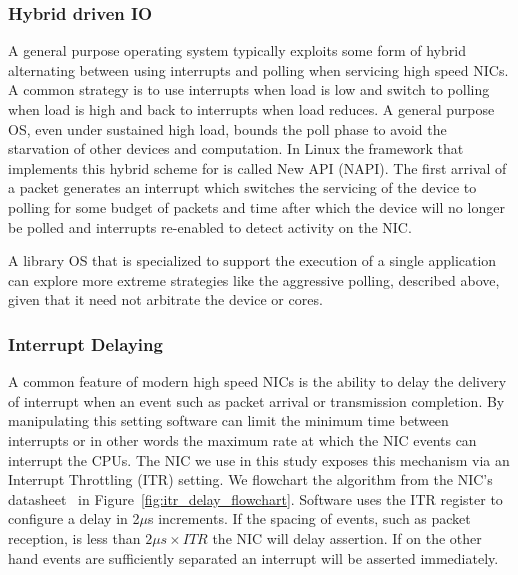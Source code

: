 \subsubsection{Hybrid driven IO}
A general purpose operating system typically exploits some form of hybrid alternating between using interrupts and polling when servicing high speed NICs. A common strategy is to use interrupts when load is low and switch to polling when load is high and back to interrupts when load reduces.  A general purpose OS, even under sustained high load, bounds the poll phase to avoid the starvation of other devices and computation.  In Linux the framework that implements this hybrid scheme for is called New API (NAPI)\cite{NAPI}.  The first arrival of a packet generates an interrupt which switches the servicing of the device to polling for some budget of packets and time after which the device will no longer be polled and interrupts re-enabled to detect activity on the NIC.  

A library OS that is specialized to support the execution of a single application can explore more extreme strategies like the aggressive polling, described above, given that it need not arbitrate the device or cores.

\subsubsection{Interrupt Delaying}

A common feature of modern high speed NICs is the ability to delay the delivery of interrupt when an event such as packet arrival or transmission completion. By manipulating this setting software can limit the minimum time between interrupts or in other words the maximum rate at which the NIC events can interrupt the CPUs. The NIC we use in this study exposes this mechanism via an Interrupt Throttling (ITR) setting.  We flowchart the algorithm from the NIC's datasheet~\cite{82599} in  Figure~\ref{fig:itr_delay_flowchart}. Software uses the ITR register to configure a delay in 2$\mu$s increments.  If the spacing of events, such as packet reception, is less than  $2{\mu}s \times ITR$ the NIC will delay assertion.  If on the other hand events are sufficiently separated an interrupt will be asserted immediately.   


